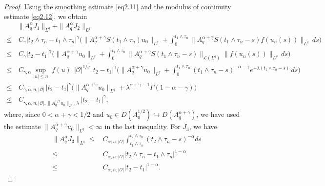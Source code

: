 \documentclass[10pt]{article}
\numberwithin{figure}{section}
\numberwithin{equation}{section}
\newcommand{\0}{{\theta}}
\begin{document}
\begin{proof}
Using the smoothing estimate \eqref{eq2.11} and the modulus of continuity estimate \eqref{eq2.12}, we obtain
\begin{equation*}
\begin{split}
&\|A_q^\alpha J_1\|_{L^q}+\|A_q^\alpha J_2\|_{L^q}\\
\le&\,C_\gamma |t_2\wedge\tau_n-t_1\wedge\tau_n|^\gamma
\Big(\|A_q^{\alpha+\gamma}S(t_1\wedge\tau_n)u_0\|_{L^q}+\int_0^{t_1\wedge\tau_n}\|A_q^{\alpha+\gamma}S(t_1\wedge\tau_n-s)f(u_n(s))\|_{L^q}\,ds\Big)\\
\le&\,C_\gamma |t_2-t_1|^\gamma
\Big(\|A_q^{\alpha+\gamma}u_0\|_{L^q}+\int_0^{t_1\wedge\tau_n}\|A_q^{\alpha+\gamma}S(t_1\wedge\tau_n-s)\|_{\mathcal L(L^q)}\|f(u_n(s))\|_{L^q}\,ds\Big)\\
\le&\,C_{\gamma,\alpha}\sup_{|u|\le n}|f(u)|\,|\mathcal O|^{1/q}\,|t_2-t_1|^\gamma
\Big(\|A_q^{\alpha+\gamma}u_0\|_{L^q}+\int_0^{t_1\wedge\tau_n}(t_1\wedge\tau_n-s)^{-\alpha-\gamma}e^{-\lambda(t_1\wedge\tau_n-s)}\,ds\Big)\\
\le&\,C_{\gamma,\alpha,n,|\mathcal O|}\,|t_2-t_1|^\gamma
\big(\|A_q^{\alpha+\gamma}u_0\|_{L^q}+\lambda^{\alpha+\gamma-1}\Gamma(1-\alpha-\gamma)\big)\\
\le&\,C_{\gamma,\alpha,n,|\mathcal O|,\|A_q^{1/2}u_0\|_{L^q},\lambda}\,|t_2-t_1|^\gamma,
\end{split}
\end{equation*}
where, since $0<\alpha+\gamma<1/2$ and $u_0\in D(A_0^{1/2})\hookrightarrow D(A_q^{\alpha+\gamma})$, we have used the estimate
$
\|A_q^{\alpha+\gamma}u_0\|_{L^q}<\infty
$
in the last inequality.
\vs
For $J_3$, we have
\begin{equation*}
\begin{split}
\|A_q^\alpha J_3\|_{L^q} \le&\, C_{\alpha,n,|\mathcal O|}\int_{t_1\wedge\tau_n}^{t_2\wedge\tau_n}(t_2\wedge\tau_n-s)^{-\alpha}ds\\
\le&\,C_{\alpha,n,|\mathcal O|}|t_2\wedge\tau_n-t_1\wedge\tau_n|^{1-\alpha}\\
\le&\, C_{\alpha,n,|\mathcal O|}|t_2-t_1|^{1-\alpha}.
\end{split}
\end{equation*}


\end{proof}
\end{document}
